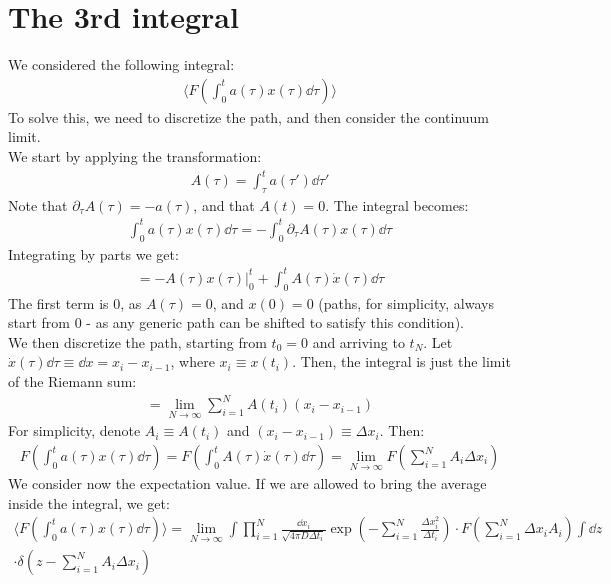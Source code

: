 \documentclass[../template.tex]{subfiles}
\begin{document}
\section{The 3rd integral}
We considered the following integral:
\begin{align*}
    \langle F\left(\int_{0}^{t} a(\tau) x(\tau) \dd{\tau}\right) \rangle
\end{align*}
To solve this, we need to discretize the path, and then consider the continuum limit.\\
We start by applying the transformation:
\begin{align*}
    A(\tau) = \int_{\tau}^{t} a(\tau') \dd{\tau'}
\end{align*}
Note that $\partial_\tau A(\tau) = -a(\tau)$, and that $A(t) = 0$. The integral becomes:
\begin{align*}
    \int_{0}^{t} a(\tau) x(\tau) \dd{\tau} = - \int_{0}^{t} \partial_\tau  A(\tau) x(\tau) \dd{\tau} 
\end{align*}  
Integrating by parts we get:
\begin{align*}
    = - A(\tau) x(\tau) \Big|_0^t + \int_0^t A(\tau) \dot{x}(\tau) \dd{\tau}
\end{align*}
The first term is $0$, as $A(\tau) = 0$, and $x(0) = 0$ (paths, for simplicity, always start from $0$ - as any generic path can be shifted to satisfy this condition).\\
We then discretize the path, starting from $t_0 = 0$ and arriving to $t_N$. Let $\dot{x}(\tau) \dd{\tau} \equiv \dd{x} = x_i - x_{i-1}$, where $x_i \equiv x(t_i)$. Then, the integral is just the limit of the Riemann sum:
\begin{align*}
    = \lim_{N \to \infty} \sum_{i=1}^N A(t_i) (x_i - x_{i-1})
\end{align*}        
For simplicity, denote $A_i \equiv A(t_i)$ and $(x_i - x_{i-1}) \equiv \Delta x_i$. Then:
\begin{align*}
    F\left(\int_0^t a(\tau) x(\tau) \dd{\tau}\right) = F\left(\int_{0}^{t} A(\tau) \dot{x}(\tau) \dd{\tau} \right) = \lim_{N \to \infty} F\left(\sum_{i=1}^N A_i \Delta x_i\right)
\end{align*}  
We consider now the expectation value. If we are allowed to bring the average inside the integral, we get:
\begin{align*}
    \langle F\left(\int_{0}^{t} a(\tau) x(\tau)\dd{\tau}\right) \rangle = \lim_{N \to \infty} \int \prod_{i=1}^N \frac{\dd{x_i}}{\sqrt{4 \pi D \Delta t_i}} \exp \left(-\sum_{i=1}^N \frac{\Delta x_i^2}{\Delta t_i} \right)  \cdot F\left(\sum_{i=1}^N \Delta x_i A_i\right) \int \dd{z}\\
    \cdot \delta\left(z-\sum_{i=1}^N A_i \Delta x_i\right)
\end{align*}
\end{document}
